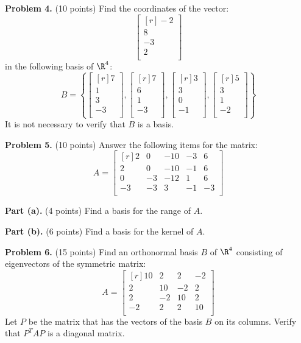 \documentclass[12pt]{article}
\begin{document}
\textbf{Problem 4.} (10 points) Find the coordinates of the vector:
\[
\begin{bmatrix*}[r]-2\\ 8\\ -3\\ 2\\ \end{bmatrix*}
\]
in the following basis of $\R^4$:
\[
B=\left\{
\begin{bmatrix*}[r]7\\ 1\\ 3\\ -3\\ \end{bmatrix*},\begin{bmatrix*}[r]7\\ 6\\ 1\\ -3\\ \end{bmatrix*},\begin{bmatrix*}[r]3\\ 3\\ 0\\ -1\\ \end{bmatrix*},\begin{bmatrix*}[r]5\\ 3\\ 1\\ -2\\ \end{bmatrix*}
\right\}
\]
It is not necessary to verify that $B$ is a basis.

\clearpage

\textbf{Problem 5.} (10 points) Answer the following items for the matrix:
\[
A = \begin{bmatrix*}[r]2&0&-10&-3&6\\2&0&-10&-1&6\\0&-3&-12&1&6\\-3&-3&3&-1&-3\\\end{bmatrix*}
\]

\textbf{Part (a).} (4 points) Find a basis for the range of $A$.

\clearpage

\textbf{Part (b).} (6 points) Find a basis for the kernel of $A$.

\clearpage

\textbf{Problem 6.} (15 points) Find an orthonormal basis $B$ of $\R^4$ consisting of eigenvectors of the symmetric matrix:
\[
A = \begin{bmatrix*}[r]10&2&2&-2\\2&10&-2&2\\2&-2&10&2\\-2&2&2&10\\\end{bmatrix*}
\]
Let $P$ be the matrix that has the vectors of the basis $B$ on its columns. Verify that $P^TAP$ is a diagonal matrix.
\end{document}
